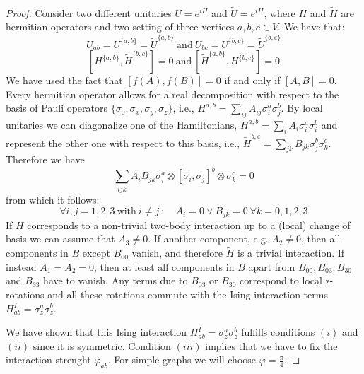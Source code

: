 \documentclass[10pt,a4paper]{book}
\numberwithin{equation}{chapter}
\numberwithin{figure}{chapter}
\numberwithin{table}{chapter}
\begin{document}
\begin{proof} Consider two different unitaries $U=e^{iH}$ and $\tilde{U}=e^{i\tilde{H}}$, where $H$ and $\tilde{H}$ are hermitian operators and two setting of three vertices $a,b,c \in V$. We have that:
\begin{equation*}
U_{ab}=U^{\lbrace a,b \rbrace}=\tilde{U}^{\lbrace a,b \rbrace} \:  \textrm{and} \: U_{bc}=U^{\lbrace b,c \rbrace}=\tilde{U}^{\lbrace b,c \rbrace}
\end{equation*}
\begin{equation*}
\left[ H^{\lbrace a,b \rbrace}, \tilde{H}^{\lbrace b,c \rbrace}\right]=0 \:  \textrm{and} \: \left[ \tilde{H}^{\lbrace a,b \rbrace}, H^{\lbrace b,c \rbrace}\right]=0
\end{equation*}
We have used the fact that $\left[ f(A),f(B)\right]=0$ if and only if $[A,B]=0$. Every hermitian operator allows for a real decomposition with respect to the basis of Pauli operators $\lbrace \sigma_{0}, \sigma_{x}, \sigma_{y}, \sigma_{z} \rbrace$, i.e., $H^{a,b} = \sum_{ij}A_{ij}\sigma^{a}_{i}\sigma^{b}_{j}$. By local unitaries we can diagonalize one of the Hamiltonians, $H^{a,b} = \sum_{i}A_{i}\sigma^{a}_{i}\sigma^{b}_{i}$ and represent the other one with respect to this basis, i.e., $\tilde{H}^{b,c} = \sum_{jk}B_{jk}\sigma^{b}_{j}\sigma^{c}_{k}$. Therefore we have
\begin{equation}
\sum_{ijk}A_{i}B_{jk}\sigma^{a}_{i}\otimes [\sigma_i ,\sigma_j]^{b} \otimes \sigma^{c}_k =0
\end{equation}
from which it follows:
\begin{equation}
\forall i,j =1,2,3 \: \textrm{with} \: i\neq j \: : \quad A_i = 0 \vee B_{jk}=0 \: \forall k = 0,1,2,3
\end{equation}
If $H$ corresponds to a non-trivial two-body interaction up to a (local) change of basis we can assume that $A_3 \neq 0$. If another component, e.g. $A_2 \neq 0$, then all components in $B$ except $B_{00}$ vanish, and therefore $\tilde{H}$ is a trivial interaction. If instead $A_1 = A_2 = 0$, then at least all components in $B$ apart from $B_{00} , B_{03} , B_{30}$ and $B_{33}$ have to vanish. Any terms due to $B_{03}$ or $B_{30}$ correspond to local z-rotations and all these rotations commute with the Ising interaction terms $H^{I}_{ab}=\sigma^{a}_{z}\sigma^{b}_{z}$. 

We have shown that this Ising interaction $H^{I}_{ab}=\sigma^{a}_{z}\sigma^{b}_{z}$ fulfills conditions $(i)$ and $(ii)$ since it is symmetric. Condition $(iii)$ implies that we have to fix the interaction strenght $\varphi_{ab}$. For simple graphs we will choose $\varphi = \frac{\pi}{4}$.
\end{proof}
\end{document}
